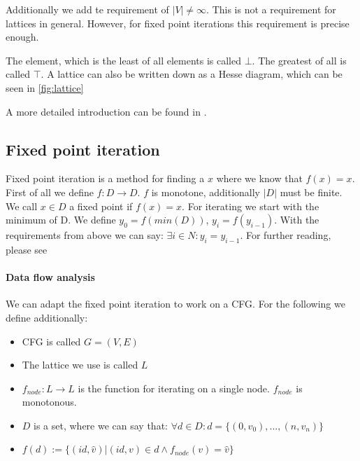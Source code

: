 Additionally we add te requirement of $|V| \not= \infty$. This is not a requirement for lattices in general. However, for fixed point iterations this requirement is precise enough.

The element, which is the least of all elements is called $\bot$. The greatest of all is called $\top$. A lattice can also be written down as a Hesse diagram, which can be seen in \autoref{fig:lattice}

A more detailed introduction can be found in \cite{lattice_theory}.

\subsection{Fixed point iteration}
Fixed point iteration is a method for finding a $x$ where we know that $f(x)=x$. \newline
First of all we define $f: D \rightarrow D$. $f$ is monotone, additionally $|D|$ must be finite. We call $x \in D$ a fixed point if $f(x)=x$.
For iterating we start with the minimum of D. We define $y_0=f(min(D))$, $y_i=f(y_{i-1})$. With the requirements from above we can say: $\exists i \in N : y_i = y_{i-1}$. For further reading, please see \cite{fixed-point-iteration-basic}


\paragraph{Data flow analysis}
We can adapt the fixed point iteration to work on a CFG. For the following we define additionally:
\begin{itemize}
	\item CFG is called $G=(V,E)$
	\item The lattice we use is called $L$
	\item $f _{node}:L \rightarrow L$ is the function for iterating on a single node. $f _{node}$ is monotonous.
	\item $D$ is a set, where we can say that: $\forall d \in D: d = \{(0, v_0), ... , (n, v_n)\}$
	\item $f(d) := \{(id, \hat{v})| (id, v) \in d \wedge f _{node}(v) = \hat{v}\}$
\end{itemize}


